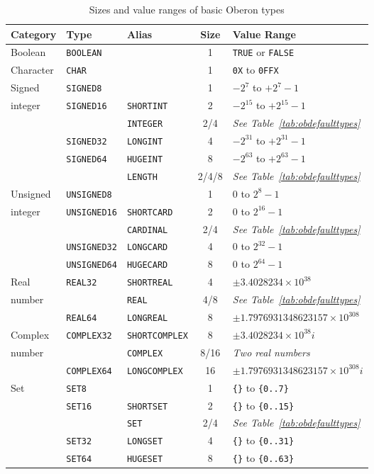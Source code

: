 \begin{itemize}
\begin{table}
\centering
\begin{tabular}{@{}lllcl@{}}
\toprule Category & Type & Alias & Size & Value Range \\
\midrule Boolean
& \texttt{BOOLEAN} & & 1 & \texttt{TRUE} or \texttt{FALSE} \\
\midrule Character
& \texttt{CHAR} & & 1 & \texttt{0X} to \texttt{0FFX} \\
\midrule Signed
& \texttt{SIGNED8} & & 1 & $-2^{7}$ to $+2^{7}-1$ \\
integer
& \texttt{SIGNED16} & \texttt{SHORTINT} & 2 & $-2^{15}$ to $+2^{15}-1$ \\
& & \texttt{INTEGER} & 2/4 & \emph{See Table~\ref{tab:obdefaulttypes}} \\
& \texttt{SIGNED32} & \texttt{LONGINT} & 4 & $-2^{31}$ to $+2^{31}-1$ \\
& \texttt{SIGNED64} & \texttt{HUGEINT} & 8 & $-2^{63}$ to $+2^{63}-1$ \\
& & \texttt{LENGTH} & 2/4/8 & \emph{See Table~\ref{tab:obdefaulttypes}} \\
\midrule Unsigned
& \texttt{UNSIGNED8} & & 1 & $0$ to $2^{8}-1$ \\
integer
& \texttt{UNSIGNED16} & \texttt{SHORTCARD} & 2 & $0$ to $2^{16}-1$ \\
& & \texttt{CARDINAL} & 2/4 & \emph{See Table~\ref{tab:obdefaulttypes}} \\
& \texttt{UNSIGNED32} & \texttt{LONGCARD} & 4 & $0$ to $2^{32}-1$ \\
& \texttt{UNSIGNED64} & \texttt{HUGECARD} & 8 & $0$ to $2^{64}-1$ \\
\midrule Real
& \texttt{REAL32} & \texttt{SHORTREAL} & 4 & $\pm 3.4028234 \times 10^{38}$ \\
number
& & \texttt{REAL} & 4/8 & \emph{See Table~\ref{tab:obdefaulttypes}} \\
& \texttt{REAL64} & \texttt{LONGREAL} & 8 & $\pm 1.7976931348623157 \times 10^{308}$ \\
\midrule Complex
& \texttt{COMPLEX32} & \texttt{SHORTCOMPLEX} & 8 & $\pm 3.4028234 \times 10^{38}i$ \\
number
& & \texttt{COMPLEX} & 8/16 & \emph{Two real numbers} \\
& \texttt{COMPLEX64} & \texttt{LONGCOMPLEX} & 16 & $\pm 1.7976931348623157 \times 10^{308}i$ \\
\midrule Set
& \texttt{SET8} & & 1 & \texttt{\{\}} to \texttt{\{0..7\}} \\
& \texttt{SET16} & \texttt{SHORTSET} & 2 & \texttt{\{\}} to \texttt{\{0..15\}} \\
& & \texttt{SET} & 2/4 & \emph{See Table~\ref{tab:obdefaulttypes}} \\
& \texttt{SET32} & \texttt{LONGSET} & 4 & \texttt{\{\}} to \texttt{\{0..31\}} \\
& \texttt{SET64} & \texttt{HUGESET} & 8 & \texttt{\{\}} to \texttt{\{0..63\}} \\
\bottomrule
\end{tabular}
\caption{Sizes and value ranges of basic Oberon types}
\label{tab:obbasictypes}
\end{table}


\end{itemize}
